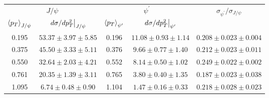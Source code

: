 \begin{tabular}{cc|cc|c}
\hline
\multicolumn{2}{c|}{$J/\psi$}                                 & \multicolumn{2}{c|}{$\psi^{\prime}$}                                 & \multirow{2}{*}{$\sigma_{\psi^\prime}/\sigma_{J/\psi}$} \\ \cline{1-4}
$\expval{p_T}_{J/\psi}$    & $\eval{d\sigma/dp^2_T}_{J/\psi}$ & $\expval{p_T}_{\psi^\prime}$ & $\eval{d\sigma/dp^2_T}_{\psi^\prime}$ &                                                         \\ \hline
\multicolumn{1}{c|}{0.195} & $53.37\pm3.97\pm5.85$            & \multicolumn{1}{c|}{0.196}   & $11.08\pm0.93\pm1.14$                 & $0.208\pm0.023\pm0.004$                                 \\
\multicolumn{1}{c|}{0.375} & $45.50\pm3.33\pm5.11$            & \multicolumn{1}{c|}{0.376}   & $9.66\pm0.77\pm1.40$                  & $0.212\pm0.023\pm0.011$                                 \\
\multicolumn{1}{c|}{0.550} & $32.64\pm2.03\pm4.21$            & \multicolumn{1}{c|}{0.552}   & $8.14\pm0.50\pm1.02$                  & $0.249\pm0.022\pm0.002$                                 \\
\multicolumn{1}{c|}{0.761} & $20.35\pm1.39\pm3.11$            & \multicolumn{1}{c|}{0.765}   & $3.80\pm0.40\pm1.35$                  & $0.187\pm0.023\pm0.038$                                 \\
\multicolumn{1}{c|}{1.095} & $6.74\pm0.48\pm0.90$             & \multicolumn{1}{c|}{1.104}   & $1.47\pm0.16\pm0.33$                  & $0.218\pm0.028\pm0.023$                                 \\ \hline
\end{tabular}
